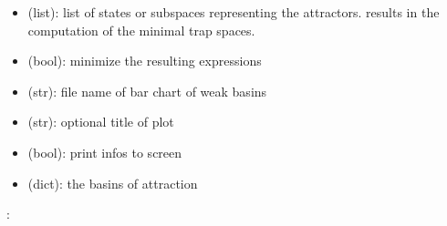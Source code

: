 \documentclass[letterpaper,10pt,english]{sphinxmanual}
\begin{document}
\begin{fulllineitems}
\begin{description}
\begin{itemize}
\item {} 
 (list): list of states or subspaces representing the attractors.  results in the computation of the minimal trap spaces.

\item {} 
 (bool): minimize the resulting expressions

\item {} 
 (str): file name of bar chart of weak basins

\item {} 
 (str): optional title of plot

\item {} 
 (bool): print infos to screen

\end{itemize}

\item[{\sphinxstylestrong{returns}::}] \leavevmode\begin{itemize}
\item {} 
 (dict): the basins of attraction

\end{itemize}

\end{description}

:

\begin{sphinxVerbatim}[commandchars=\\\{\}]
  
 
\end{sphinxVerbatim}

\end{fulllineitems}
\end{document}
